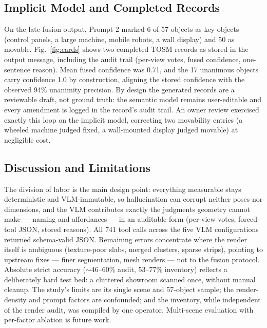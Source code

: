 \documentclass[conference]{IEEEtran}
\begin{document}
\subsection{Implicit Model and Completed Records}
On the late-fusion output, Prompt 2 marked 6 of 57 objects as key objects
(control panels, a large machine, mobile robots, a wall display) and 50 as
movable. Fig.~\ref{fig:cards} shows two completed TOSM records as stored in
the output message, including the audit trail (per-view votes, fused
confidence, one-sentence reason). Mean fused confidence was 0.71, and the
17 unanimous objects carry confidence 1.0 by construction, aligning the
stored confidence with the observed 94\% unanimity precision. By design
the generated records are a reviewable draft, not ground truth: the
semantic model remains user-editable and every amendment is logged in the
record's audit trail. An owner review exercised exactly this loop on the
implicit model, correcting two movability entries (a wheeled machine
judged fixed, a wall-mounted display judged movable) at negligible cost.

\subsection{Discussion and Limitations}
The division of labor is the main design point: everything measurable stays
deterministic and VLM-immutable, so hallucination can corrupt neither poses
nor dimensions, and the VLM contributes exactly the judgments geometry
cannot make --- naming and affordances --- in an auditable form (per-view
votes, forced-tool JSON, stored reasons). All 741 tool calls
across the five VLM configurations returned schema-valid
JSON. Remaining errors concentrate where the render itself is ambiguous
(texture-poor slabs, merged clusters, sparse strips), pointing to upstream
fixes --- finer segmentation, mesh renders --- not to the fusion protocol.
Absolute strict accuracy ($\sim$46--60\% audit, 53--77\% inventory)
reflects a deliberately hard test bed: a cluttered showroom scanned once,
without manual cleanup. The study's limits are its single scene and
57-object sample; the render-density and prompt factors are confounded;
and the inventory, while independent of the render audit, was compiled by
one operator. Multi-scene evaluation with per-factor ablation is future
work.
\end{document}
